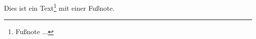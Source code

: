 \documentclass{article}
\begin{document}
Dies ist ein Text\footnote{Fußnote ...} mit einer Fußnote.
\end{document}
